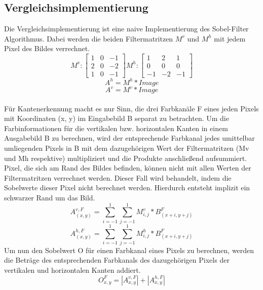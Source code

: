 \documentclass[course=erap]{aspdoc}
\begin{document}
\subsection{Vergleichsimplementierung}
\label{sec:vergleichsimplementierung}
Die Vergleichsimplementierung ist eine naive Implementierung des Sobel-Filter Algorithmus.
Dabei werden die beiden Filtermatritzen $M^{v}$ und $M^{h}$ mit jedem Pixel des Bildes verrechnet.
\begin{equation}
    M^{v} :
    \begin{bmatrix}
        1 & 0 & -1 \\
        2 & 0 & -2 \\
        1 & 0 & -1
    \end{bmatrix}
    M^{h} :
    \begin{bmatrix}
        1 & 2 & 1 \\
        0 & 0 & 0 \\
        -1 & -2 & -1
    \end{bmatrix}
\end{equation}
\begin{equation}
    A^{h} = M^{h} * Image
\end{equation}
\begin{equation}
    A^{v} = M^{v} * Image
\end{equation} \\
Für Kantenerkennung macht es nur Sinn, die drei Farbkanäle F eines jeden Pixels mit Koordinaten (x, y) im Eingabebild B separat zu betrachten.
Um die Farbinformationen für die vertikalen bzw. horizontalen Kanten in einem Ausgabebild B zu berechnen, wird der entsprechende Farbkanal jedes umittelbar umliegenden Pixels in B mit dem dazugehörigen Wert der Filtermatritzen (Mv und Mh respektive) multipliziert und die Produkte anschließend aufsummiert.
Pixel, die sich am Rand des Bildes befinden, können nicht mit allen Werten der Filtermatritzen verrechnet werden.
Dieser Fall wird behandelt, indem die Sobelwerte dieser Pixel nicht berechnet werden.
Hierdurch entsteht implizit ein schwarzer Rand um das Bild.
\begin{equation}
    A_(x,y)^{v,F} = \sum_{i=-1}^{1} \sum_{j=-1}^{1} M^{v}_{i,j} * B_{(x+i,y+j)}^{F}
\end{equation}
\begin{equation}
    A_(x,y)^{h,F} = \sum_{i=-1}^{1} \sum_{j=-1}^{1} M^{h}_{i,j} * B_{(x+i,y+j)}^{F}
\end{equation}
Um nun den Sobelwert O für einen Farbkanal eines Pixels zu berechnen, werden die Beträge des entsprechenden Farbkanals des dazugehörigen Pixels der vertikalen und horizontalen Kanten addiert.
\begin{equation}
    O^{F}_{x,y} = \left | A^{v,F}_{x,y} \right | + \left | A^{h,F}_{x,y} \right |
    \label{eq:betrag}
\end{equation}
\end{document}
